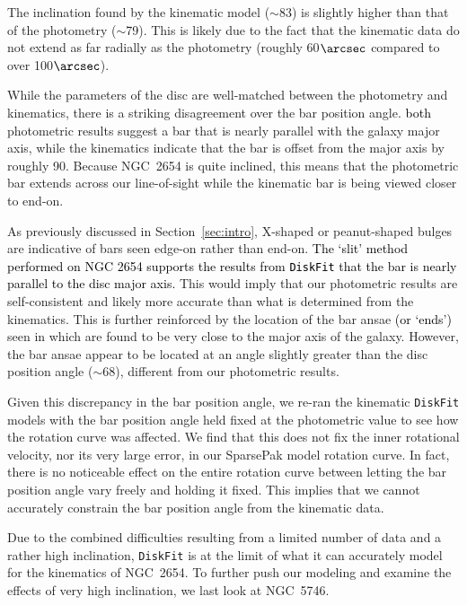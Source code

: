 \documentclass[a4paper,fleqn,usenatbib]{mnras}
\newcommand{\authorfix}{\textcolor{black}}
\begin{document}
The inclination found by the kinematic model ($\sim$83\degr) is slightly higher than that of the photometry ($\sim$79\degr). This is likely due to the fact that the kinematic data do not extend as far radially as the photometry (roughly 60$\arcsec$ compared to over 100$\arcsec$). 

While the parameters of the disc are well-matched between the photometry and kinematics, there is a striking disagreement over the bar position angle.  \authorfix{both} photometric results suggest a bar that is nearly parallel with the galaxy major axis, while the kinematics indicate that the bar is offset from the major axis by roughly 90\degr. Because NGC~2654 is quite inclined, this means that the photometric bar extends across our line-of-sight while the kinematic bar is being viewed closer to end-on.

As previously discussed in Section~\ref{sec:intro}, X-shaped or peanut-shaped bulges are indicative of bars seen edge-on rather than end-on. \authorfix{The `slit' method performed on NGC 2654 supports the results from \texttt{DiskFit} that the bar is nearly parallel to the disc major axis.} This would imply that our photometric results are self-consistent and likely more accurate than what is determined from the kinematics. This is further reinforced by the location of the bar ansae \authorfix{(or `ends')} seen in \citet{buta2015} which are found to be very close to the major axis of the galaxy. However, the bar ansae appear to be located at an angle slightly greater than the disc position angle ($\sim$68\degr), different from our photometric results. 

Given this discrepancy in the bar position angle, we re-ran the kinematic \texttt{DiskFit} models with the bar position angle held fixed at the photometric value to see how the rotation curve was affected. We find that this does not fix the inner rotational velocity, nor its very large error, in our SparsePak model rotation curve. In fact, there is no noticeable effect on the entire rotation curve between letting the bar position angle vary freely and holding it fixed. This implies that we cannot accurately constrain the bar position angle from the kinematic data.

Due to the combined difficulties resulting from a limited number of data and a rather high inclination, \texttt{DiskFit} is at the limit of what it can accurately model for the kinematics of NGC~2654. To further push our modeling and examine the effects of very high inclination, we last look at NGC~5746. 
\end{document}
